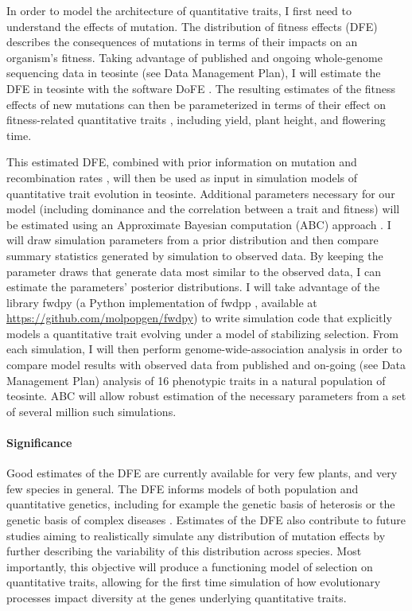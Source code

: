 In order to model the architecture of quantitative traits, I first need to understand the effects of mutation. The distribution of fitness effects (DFE) describes the consequences of mutations in terms of their impacts on an organism's fitness. Taking advantage of published \citep{Chia:2012} and ongoing whole-genome sequencing data in teosinte (see Data Management Plan), I will estimate the DFE in teosinte with the software DoFE \citep{Keightley:2007hq, Stoletzki:2011}. The resulting estimates of the fitness effects of new mutations can then be parameterized in terms of their effect on fitness-related quantitative traits \citep{Keightley:1988, eyre-walker:2010}, including yield, plant height, and flowering time.

This estimated DFE, combined with prior information on mutation \citep{Clark:2005} and recombination rates \citep{Rodgers-Melnick:2014}, will then be used as input in simulation models of quantitative trait evolution in teosinte. Additional parameters necessary for our model (including dominance and the correlation between a trait and fitness) will be estimated using an Approximate Bayesian computation (ABC) approach \citep{Beaumont:2002ue}. I will draw simulation parameters from a prior distribution and then compare summary statistics generated by simulation to observed data. By keeping the parameter draws that generate data most similar to the observed data, I can estimate the parameters' posterior distributions. I will take advantage of the library fwdpy (a Python implementation of fwdpp \citep{Thornton:2014kn}, available at \url{https://github.com/molpopgen/fwdpy}) to write simulation code that explicitly models a quantitative trait evolving under a model of stabilizing selection. From each simulation, I will then perform genome-wide-association analysis in order to compare model results with observed data from published \citep{Weber:2009} and on-going (see Data Management Plan) analysis of 16 phenotypic traits in a natural population of teosinte. ABC will allow robust estimation of the necessary parameters from a set of several million such simulations.

\vspace{-2ex}
\paragraph{Significance}
Good estimates of the DFE are currently available for very few plants, and very few species in general. The DFE informs models of both population and quantitative genetics, including for example the genetic basis of heterosis \citep{Mezmouk:2014jd} or the genetic basis of complex diseases \citep{EyreWalker:2007dl}. Estimates of the DFE also contribute to future studies aiming to realistically simulate any distribution of mutation effects by further describing the variability of this distribution across species. Most importantly, this objective will produce a functioning model of selection on quantitative traits, allowing for the first time simulation of how evolutionary processes impact diversity at the genes underlying quantitative traits. 

